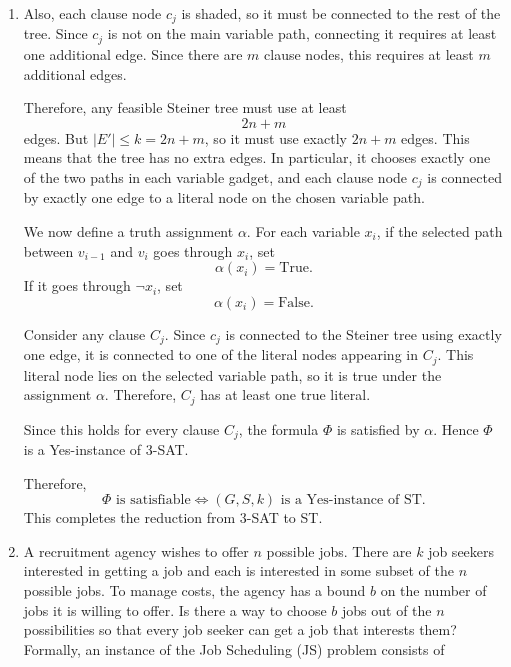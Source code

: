 \documentclass[12pt,a4paper]{article}
\makeatletter
\newtheorem*{solution}{Solution}
\theoremstyle{definition}
\renewenvironment{solution}[1][Solution] {\par\pushQED{\qed}\normalfont\topsep6\p@\@plus6\p@\relax\trivlist\item[\hskip\labelsep\bfseries#1\@addpunct{.}]\ignorespaces}{\popQED\endtrivlist\@endpefalse} \makeatother
\makeatother
\begin{document}
\begin{enumerate}
\begin{solution}
\begin{enumerate}
        Also, each clause node \(c_j\) is shaded, so it must be connected to
        the rest of the tree. Since \(c_j\) is not on the main variable path,
        connecting it requires at least one additional edge. Since there are
        \(m\) clause nodes, this requires at least \(m\) additional edges.

        Therefore, any feasible Steiner tree must use at least
        \[
        2n+m
        \]
        edges. But \(|E'|\leq k=2n+m\), so it must use exactly \(2n+m\) edges.
        This means that the tree has no extra edges. In particular, it chooses
        exactly one of the two paths in each variable gadget, and each clause
        node \(c_j\) is connected by exactly one edge to a literal node on the
        chosen variable path.

        We now define a truth assignment \(\alpha\). For each variable \(x_i\),
        if the selected path between \(v_{i-1}\) and \(v_i\) goes through
        \(x_i\), set
        \[
        \alpha(x_i)=\mathrm{True}.
        \]
        If it goes through \(\neg x_i\), set
        \[
        \alpha(x_i)=\mathrm{False}.
        \]

        Consider any clause \(C_j\). Since \(c_j\) is connected to the Steiner
        tree using exactly one edge, it is connected to one of the literal
        nodes appearing in \(C_j\). This literal node lies on the selected
        variable path, so it is true under the assignment \(\alpha\). Therefore,
        \(C_j\) has at least one true literal.

        Since this holds for every clause \(C_j\), the formula \(\Phi\) is
        satisfied by \(\alpha\). Hence \(\Phi\) is a Yes-instance of 3-SAT.

        Therefore,
        \[
        \Phi \text{ is satisfiable}
        \iff
        (G,S,k) \text{ is a Yes-instance of ST}.
        \]
        This completes the reduction from 3-SAT to ST.
    \end{enumerate}
\end{solution}



    \newpage
    \item {\color{purple}{(NP-Complete)}} 
    
    A recruitment agency wishes to offer $n$ possible jobs. There are $k$ job seekers interested in getting a job and each is interested in some subset of the $n$ possible jobs. To manage costs, the agency has a bound $b$ on the number of jobs it is willing to offer. Is there a way to choose $b$ jobs out of the $n$ possibilities so that every job seeker can get a job that interests them? Formally, an instance of the Job Scheduling (JS) problem consists of
    

\end{enumerate}
\end{document}
